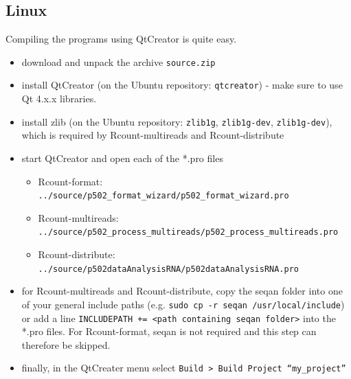 \documentclass[a4paper,10pt]{article}
\begin{document}
\subsection{Linux}
Compiling the programs using QtCreator is quite easy.
\begin{itemize}
\item download and unpack the archive \texttt{source.zip}
\item install QtCreator (on the Ubuntu repository: \texttt{qtcreator}) - make sure to use Qt 4.x.x libraries.
\item install zlib (on the Ubuntu repository: \texttt{zlib1g}, \texttt{zlib1g-dev}, \texttt{zlib1g-dev}), which is required by Rcount-multireads and Rcount-distribute
\item start QtCreator and open each of the *.pro files
\begin{itemize}
\item Rcount-format: \texttt{../source/p502\_format\_wizard/p502\_format\_wizard.pro}
\item Rcount-multireads: \texttt{../source/p502\_process\_multireads/p502\_process\_multireads.pro}
\item Rcount-distribute: \texttt{../source/p502dataAnalysisRNA/p502dataAnalysisRNA.pro}
\end{itemize}
\item for Rcount-multireads and Rcount-distribute, copy the seqan folder into one of your general include paths (e.g. \texttt{sudo cp -r seqan /usr/local/include}) or add a line \texttt{INCLUDEPATH += <path containing seqan folder>} into the *.pro files. For Rcount-format, seqan is not required and this step can therefore be skipped.
\item finally, in the QtCreater menu select \texttt{Build > Build Project ``my\_project''}
\end{itemize}
\end{document}
